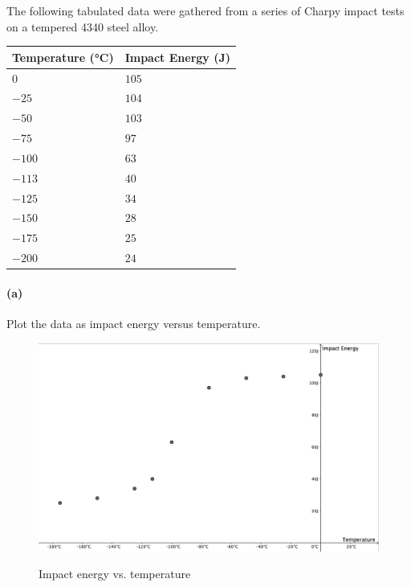  The following tabulated data were gathered from a series of Charpy impact tests on a tempered 4340 steel alloy. 
\begin{table}[ht]
\centering
\begin{tabular}{|l|l|}
\hline
\textbf{Temperature (\unit{\celsius})} & \textbf{Impact Energy (\unit{J})} \\ \hline
\textit{$0$}                           & $105$                             \\ \hline
\textit{$-25$}                         & $104$                             \\ \hline
\textit{$-50$}                         & $103$                             \\ \hline
\textit{$-75$}                         & $97$                              \\ \hline
$-100$                                 & $63$                              \\ \hline
$-113$                                 & $40$                              \\ \hline
$-125$                                 & $34$                              \\ \hline
$-150$                                 & $28$                              \\ \hline
$-175$                                 & $25$                              \\ \hline
$-200$                                 & $24$                              \\ \hline
\end{tabular}
\end{table}

\paragraph{(a)} Plot the data as impact energy versus temperature.
\bigbreak
\begin{figure} [ht]
  \centering
  \caption{Impact energy vs. temperature}
  \includegraphics[width=0.5\linewidth]{./figures/f9_1.png}
  \label{fig:f9_1}
\end{figure}


